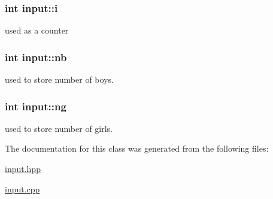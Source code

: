 \hypertarget{classinput_a79e666b856965a7115fe0136b6ddc384}{
\subsubsection[{i}]{\setlength{\rightskip}{0pt plus 5cm}int input\-::i}}\label{classinput_a79e666b856965a7115fe0136b6ddc384}


used as a counter 

\hypertarget{classinput_af078aeb4578ebe86a35f302e99119ac9}{
\subsubsection[{nb}]{\setlength{\rightskip}{0pt plus 5cm}int input\-::nb}}\label{classinput_af078aeb4578ebe86a35f302e99119ac9}


used to store number of boys. 

\hypertarget{classinput_ac3566988d536a8b7443230e3b7a9337e}{
\subsubsection[{ng}]{\setlength{\rightskip}{0pt plus 5cm}int input\-::ng}}\label{classinput_ac3566988d536a8b7443230e3b7a9337e}


used to store number of girls. 



The documentation for this class was generated from the following files\-:\begin{DoxyCompactItemize}
\item 
\hyperlink{input_8hpp}{input.\-hpp}\item 
\hyperlink{input_8cpp}{input.\-cpp}\end{DoxyCompactItemize}
